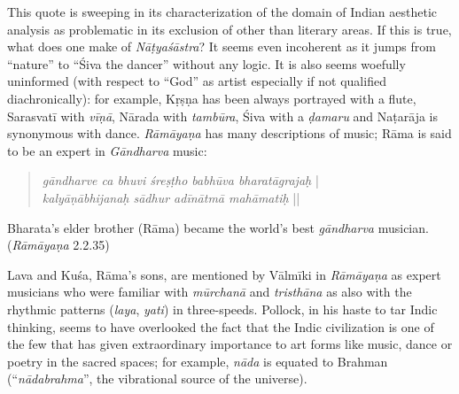 This quote is sweeping in its characterization of the domain of Indian aesthetic analysis as problematic in its exclusion of other than literary areas. If this is true, what does one make of \textsl{Nāṭyaśāstra}? It seems even incoherent as it jumps from “nature” to “Śiva the dancer” without any logic. It is also seems woefully uninformed (with respect to “God” as artist especially if not qualified diachronically): for example, Kṛṣṇa has been always portrayed with a flute, Sarasvatī with \textsl{vīṇā}, Nārada with \textsl{tambūra}, Śiva with a \textsl{ḍamaru} and Naṭarāja is synonymous with dance. \textsl{Rāmāyaṇa} has many descriptions of music; Rāma is said to be an expert in \textsl{Gāndharva} music:

\begin{quote}
\textsl{gāndharve ca bhuvi śreṣṭho babhūva bharatāgrajaḥ} |\\
\textsl{kalyāṇābhijanaḥ sādhur adīnātmā mahāmatiḥ} ||
\end{quote}

\begin{myquote}
Bharata’s elder brother (Rāma) became the world’s best \textsl{gāndharva} musician. 
\hfill(\textsl{Rāmāyaṇa} 2.2.35)
\end{myquote}

\newpage

Lava and Kuśa, Rāma’s sons, are mentioned by Vālmīki in \textsl{Rāmāyaṇa} as expert musicians who were familiar with \textsl{mūrchanā} and \textsl{tristhāna} as also with the rhythmic patterns (\textsl{laya}, \textsl{yati}) in three-speeds. Pollock, in his haste to tar Indic thinking, seems to have overlooked the fact that the Indic civilization is one of the few that has given extraordinary importance to art forms like music, dance or poetry in the sacred spaces; for example, \textsl{nāda} is equated to Brahman (``\textsl{nādabrahma}'', the vibrational source of the universe).\\[-20pt]


